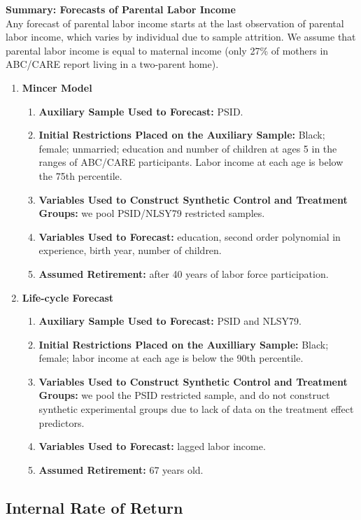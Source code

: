 \noindent \textbf{Summary: Forecasts of Parental Labor Income}\\
\noindent Any forecast of parental labor income starts at the last observation of parental labor income, which varies by individual due to sample attrition. We assume that parental labor income is equal to maternal income (only 27\% of mothers in ABC/CARE report living in a two-parent home).
\begin{enumerate}
\item \textbf{Mincer Model}
\begin{enumerate}
\item \textbf{Auxiliary Sample Used to Forecast:} PSID.
\item \textbf{Initial Restrictions Placed on the Auxiliary Sample:} Black; female; unmarried; education and number of children at ages 5 in the ranges of ABC/CARE participants. Labor income at each age is below the 75th percentile.
\item \textbf{Variables Used to Construct Synthetic Control and Treatment Groups:} we pool PSID/NLSY79 restricted samples.
\item \textbf{Variables Used to Forecast:} education, second order polynomial in experience, birth year, number of children.
\item \textbf{Assumed Retirement:} after 40 years of labor force participation.
\end{enumerate}
\item \textbf{Life-cycle Forecast}
\begin{enumerate}
\item \textbf{Auxiliary Sample Used to Forecast:} PSID and NLSY79.
\item \textbf{Initial Restrictions Placed on the Auxilliary Sample:} Black; female; labor income at each age is below the 90th percentile.
\item \textbf{Variables Used to Construct Synthetic Control and Treatment Groups:} we pool the PSID restricted sample, and do not construct synthetic experimental groups due to lack of data on the treatment effect predictors.
\item \textbf{Variables Used to Forecast:} lagged labor income.
\item \textbf{Assumed Retirement:} 67 years old.
\end{enumerate}
\end{enumerate}

\subsection{Internal Rate of Return}
\label{app:method_irr}


